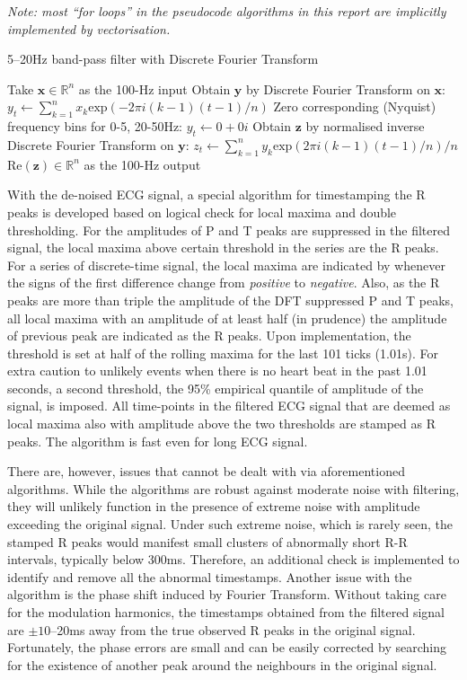 \documentclass[
]{article}
\begin{document}
\emph{Note: most ``for loops'' in the pseudocode algorithms in this
report are implicitly implemented by vectorisation.}

\begin{algorithm}
\caption{5--20Hz band-pass filter with Discrete Fourier Transform}
\begin{algorithmic}[1]
\STATE Take $\mathbf{x} \in \mathbb{R}^n$ as the 100-Hz input
\STATE Obtain $\mathbf{y}$ by Discrete Fourier Transform on $\mathbf{x}$:
\STATE $y_t \leftarrow \sum_{k = 1}^n{x_k}\text{exp}(-2\pi i(k - 1)(t - 1) / n)$
\ENDFOR
\STATE Zero corresponding (Nyquist) frequency bins for 0-5, 20-50Hz:
\STATE $y_t \leftarrow 0 + 0i$
\ENDFOR
\STATE Obtain $\mathbf{z}$ by normalised inverse Discrete Fourier Transform on $\mathbf{y}$:
\STATE $z_t \leftarrow \sum_{k = 1}^n{y_k}\text{exp}(2\pi i(k - 1)(t - 1) / n) / n$
\ENDFOR
\RETURN $\text{Re}(\mathbf{z}) \in \mathbb{R}^n$ as the 100-Hz output
\end{algorithmic}
\end{algorithm}

With the de-noised ECG signal, a special algorithm for timestamping the
R peaks is developed based on logical check for local maxima and double
thresholding. For the amplitudes of P and T peaks are suppressed in the
filtered signal, the local maxima above certain threshold in the series
are the R peaks. For a series of discrete-time signal, the local maxima
are indicated by whenever the signs of the first difference change from
\emph{positive} to \emph{negative}. Also, as the R peaks are more than
triple the amplitude of the DFT suppressed P and T peaks, all local
maxima with an amplitude of at least half (in prudence) the amplitude of
previous peak are indicated as the R peaks. Upon implementation, the
threshold is set at half of the rolling maxima for the last 101 ticks
(1.01s). For extra caution to unlikely events when there is no heart
beat in the past 1.01 seconds, a second threshold, the 95\% empirical
quantile of amplitude of the signal, is imposed. All time-points in the
filtered ECG signal that are deemed as local maxima also with amplitude
above the two thresholds are stamped as R peaks. The algorithm is fast
even for long ECG signal.

There are, however, issues that cannot be dealt with via aforementioned
algorithms. While the algorithms are robust against moderate noise with
filtering, they will unlikely function in the presence of extreme noise
with amplitude exceeding the original signal. Under such extreme noise,
which is rarely seen, the stamped R peaks would manifest small clusters
of abnormally short R-R intervals, typically below 300ms. Therefore, an
additional check is implemented to identify and remove all the abnormal
timestamps. Another issue with the algorithm is the phase shift induced
by Fourier Transform. Without taking care for the modulation harmonics,
the timestamps obtained from the filtered signal are \(\pm10\)--20ms
away from the true observed R peaks in the original signal. Fortunately,
the phase errors are small and can be easily corrected by searching for
the existence of another peak around the neighbours in the original
signal.
\end{document}
